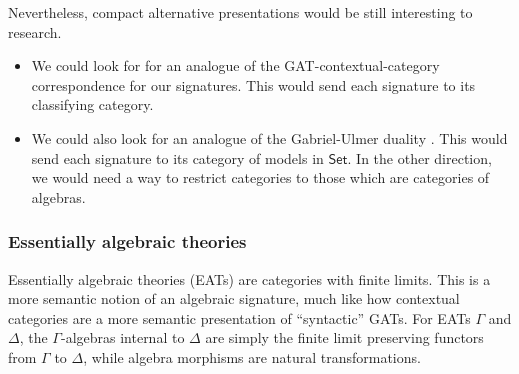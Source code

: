 \documentclass[12pt,a4paper,twoside,openany]{book}
\theoremstyle{remark}
\theoremstyle{definition}
\theoremstyle{theorem}
\newcommand{\bs}[1]{\boldsymbol{#1}}
\newcommand{\Set}{\mathsf{Set}}
\begin{document}
Nevertheless, compact alternative presentations would be still interesting to
research.
\begin{itemize}
  \item We could look for for an analogue of the
    GAT-contextual-category correspondence for our signatures. This would
    send each signature to its classifying category.
  \item We could also look for an analogue of the Gabriel-Ulmer duality
    \cite{gabriel2006lokal}. This would send each signature to its category of models in
    $\bs{\Set}$. In the other direction, we would need a way to restrict categories
    to those which are categories of algebras.
\end{itemize}

\subsubsection{Essentially algebraic theories}

Essentially algebraic theories (EATs) \cite{freyd1972aspects} are categories
with finite limits. This is a more semantic notion of an algebraic signature,
much like how contextual categories are a more semantic presentation of
``syntactic'' GATs. For EATs $\Gamma$ and $\Delta$, the $\Gamma$-algebras
internal to $\Delta$ are simply the finite limit preserving functors from
$\Gamma$ to $\Delta$, while algebra morphisms are natural transformations.
\end{document}
